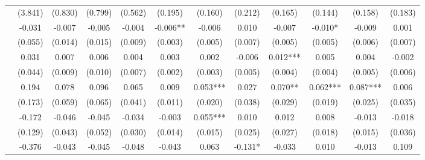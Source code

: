 \begin{table}
\begin{threeparttable}
\begin{tabular}{p{4cm}S@{}S@{}S@{}S@{}S@{}S@{}S@{}S@{}S@{}S@{}S@{}}
                                          &     (3.841)   &     (0.830)   &     (0.799)   &     (0.562)   &     (0.195)   &     (0.160)   &     (0.212)   &     (0.165)   &     (0.144)   &     (0.158)   &     (0.183)   \\
                    &      -0.031   &      -0.007   &      -0.005   &      -0.004   &      -0.006** &      -0.006   &       0.010   &      -0.007   &      -0.010*  &      -0.009   &       0.001   \\
                                          &     (0.055)   &     (0.014)   &     (0.015)   &     (0.009)   &     (0.003)   &     (0.005)   &     (0.007)   &     (0.005)   &     (0.005)   &     (0.006)   &     (0.007)   \\
                    &       0.031   &       0.007   &       0.006   &       0.004   &       0.003   &       0.002   &      -0.006   &       0.012***&       0.005   &       0.004   &      -0.002   \\
                                          &     (0.044)   &     (0.009)   &     (0.010)   &     (0.007)   &     (0.002)   &     (0.003)   &     (0.005)   &     (0.004)   &     (0.004)   &     (0.005)   &     (0.006)   \\
                       &       0.194   &       0.078   &       0.096   &       0.065   &       0.009   &       0.053***&       0.027   &       0.070** &       0.062***&       0.087***&       0.006   \\
                                          &     (0.173)   &     (0.059)   &     (0.065)   &     (0.041)   &     (0.011)   &     (0.020)   &     (0.038)   &     (0.029)   &     (0.019)   &     (0.025)   &     (0.035)   \\
            &      -0.172   &      -0.046   &      -0.045   &      -0.034   &      -0.003   &       0.055***&       0.010   &       0.012   &       0.008   &      -0.013   &      -0.018   \\
                                          &     (0.129)   &     (0.043)   &     (0.052)   &     (0.030)   &     (0.014)   &     (0.015)   &     (0.025)   &     (0.027)   &     (0.018)   &     (0.015)   &     (0.036)   \\
                &      -0.376   &      -0.043   &      -0.045   &      -0.048   &      -0.043   &       0.063   &      -0.131*  &      -0.033   &       0.010   &      -0.013   &       0.109   \\

\end{tabular}
\end{threeparttable}
\end{table}
